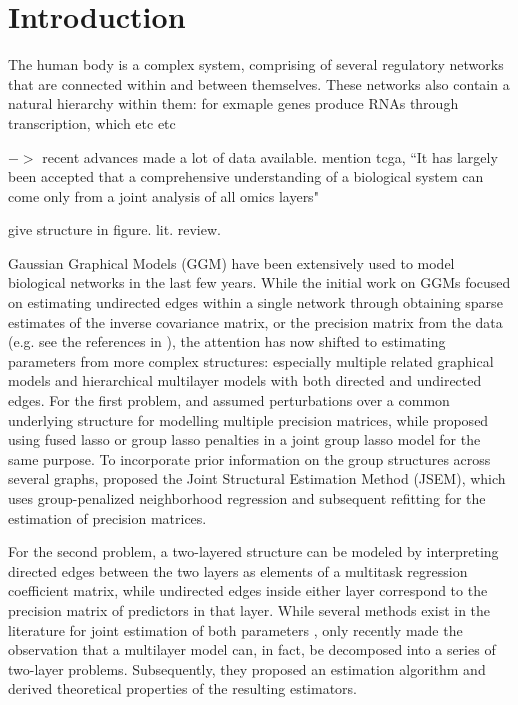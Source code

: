 \section{Introduction}
The human body is a complex system, comprising of several regulatory networks that are connected within and between themselves. These networks also contain a natural hierarchy within them: for exmaple genes produce RNAs through transcription, which etc etc

$->$ recent advances made a lot of data available. mention tcga, ``It has largely been accepted that a comprehensive understanding of a biological system can come only from a joint analysis of all omics layers"

give structure in figure. lit. review.

Gaussian Graphical Models (GGM) have been extensively used to model biological networks in the last few years. While the initial work on GGMs focused on estimating undirected edges within a single network through obtaining sparse estimates of the inverse covariance matrix, or the precision matrix from the data (e.g. see the references in \cite{BuhlmannvandeGeer11}), the attention has now shifted to estimating parameters from more complex structures: especially multiple related graphical models and hierarchical multilayer models with both directed and undirected edges. For the first problem, \cite{GuoEtal11} and \cite{XieLiuValdar16} assumed perturbations over a common underlying structure for modelling multiple precision matrices, while \cite{DanaherEtal14} proposed using fused lasso or group lasso penalties in a joint group lasso model for the same purpose. To incorporate prior information on the group structures across several graphs, \cite{MaMichailidis15} proposed the Joint Structural Estimation Method (JSEM), which uses group-penalized neighborhood regression and subsequent refitting for the estimation of precision matrices.

For the second problem, a two-layered structure can be modeled by interpreting directed edges between the two layers as elements of a multitask regression coefficient matrix, while undirected edges inside either layer correspond to the precision matrix of predictors in that layer. While several methods exist in the literature for joint estimation of both parameters \citep{RothmanEtal10, LeeLiu12, CaiEtal12}, only recently \cite{LinEtal16} made the observation that a multilayer model can, in fact, be decomposed into a series of two-layer problems. Subsequently, they proposed an estimation algorithm and derived theoretical properties of the resulting estimators.

